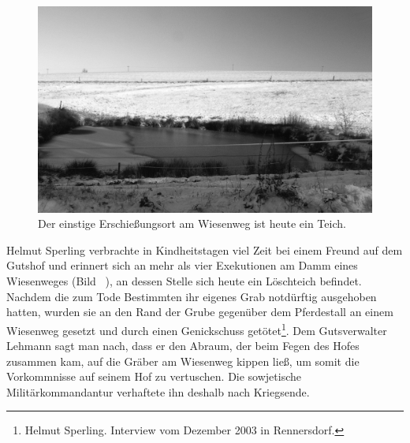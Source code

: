 \begin{figure}[htb]
    \includegraphics[width=\linewidth]{images/renn04}
    \caption[Wiesenweg / Teich]{Der einstige Erschießungsort am Wiesenweg ist heute ein Teich.}
    \label{wiesenweg}
\end{figure}


Helmut Sperling verbrachte in Kindheitstagen viel Zeit bei einem Freund auf dem Gutshof und erinnert sich an mehr als vier Exekutionen am Damm eines Wiesenweges (Bild ~), an dessen Stelle sich heute ein Löschteich befindet. Nachdem die zum Tode Bestimmten ihr eigenes Grab notdürftig ausgehoben hatten, wurden sie an den Rand der Grube gegenüber dem Pferdestall an einem Wiesenweg gesetzt und durch einen Genickschuss getötet\footnote{Helmut Sperling. Interview vom Dezember 2003 in Rennersdorf.}. Dem Gutsverwalter Lehmann sagt man nach, dass er den Abraum, der beim Fegen des Hofes zusammen kam, auf die Gräber am Wiesenweg kippen ließ, um somit die Vorkommnisse auf seinem Hof zu vertuschen. Die sowjetische Militärkommandantur verhaftete ihn deshalb nach Kriegsende. 


